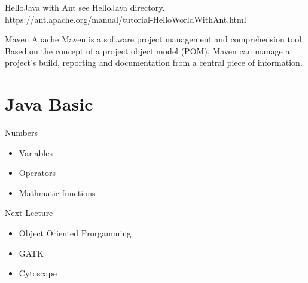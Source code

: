 \documentclass[UTF8]{beamer}
\begin{document}
\begin{frame}[t]{HelloJava with Ant}
  see HelloJava directory.\\
  https://ant.apache.org/manual/tutorial-HelloWorldWithAnt.html
\end{frame}

\begin{frame}[t]{Maven}
Apache Maven is a software project management and comprehension tool. Based on
the concept of a project object model (POM), Maven can manage a project's build,
 reporting and documentation from a central piece of information.
\end{frame}

\section{Java Basic}
\begin{frame}[t]{Numbers}
  \begin{itemize}
    \item Variables
    \item Operators
    \item Mathmatic functions
  \end{itemize}
\end{frame}

\begin{frame}[t]{Next Lecture}
  \begin{itemize}
    \item Object Oriented Prorgamming
    \item GATK
    \item Cytoscape
  \end{itemize}
\end{frame}
\end{document}
